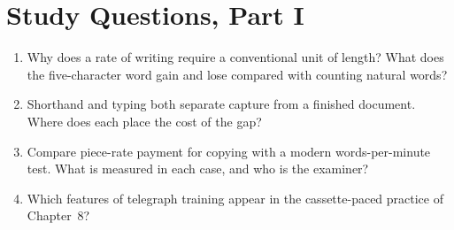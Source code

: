 \chapter*{Study Questions, Part I}
\begin{enumerate}
\item Why does a rate of writing require a conventional unit of length? What does the five-character word gain and lose compared with counting natural words?
\item Shorthand and typing both separate capture from a finished document. Where does each place the cost of the gap?
\item Compare piece-rate payment for copying with a modern words-per-minute test. What is measured in each case, and who is the examiner?
\item Which features of telegraph training appear in the cassette-paced practice of Chapter~8?
\end{enumerate}
